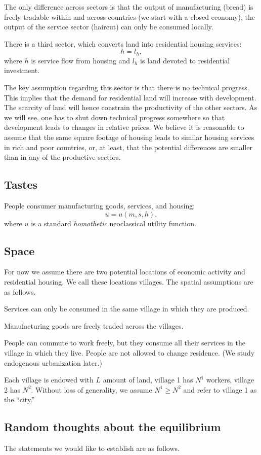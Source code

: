 \documentclass[12pt]{article}
\begin{document}
The only difference across sectors is that the output of manufacturing (bread) is freely tradable within and across countries (we start with a closed economy), the output of the service sector (haircut) can only be consumed locally.

There is a third sector, which converts land into residential housing services:
\[
h = l_h,
\]
where $h$ is service flow from housing and $l_h$ is land devoted to residential investment.

The key assumption regarding this sector is that there is no technical progress. This implies that the demand for residential land will increase with development. The scarcity of land will hence constrain the productivity of the other sectors. As we will see, one has to shut down technical progress somewhere so that development leads to changes in relative prices. We believe it is reasonable to assume that the same square footage of housing leads to similar housing services in rich and poor countries, or, at least, that the potential differences are smaller than in any of the productive sectors.

\subsection{Tastes}
People consumer manufacturing goods, services, and housing:
\[
u = u(m,s,h),
\]
where $u$ is a standard \emph{homothetic} neoclassical utility function.
\subsection{Space}
For now we assume there are two potential locations of economic activity and residential housing. We call these locations villages. The spatial assumptions are as follows.

Services can only be consumed in the same village in which they are produced.

Manufacturing goods are freely traded across the villages.

People can commute to work freely, but they consume all their services in the village in which they live. People are not allowed to change residence. (We study endogenous urbanization later.)

Each village is endowed with $L$ amount of land, village 1 has $N^1$ workers, village 2 has $N^2$. Without loss of generality, we assume $N^1\ge N^2$ and refer to village 1 as the ``city.''
\subsection{Random thoughts about the equilibrium}
The statements we would like to establish are as follows.
\end{document}
